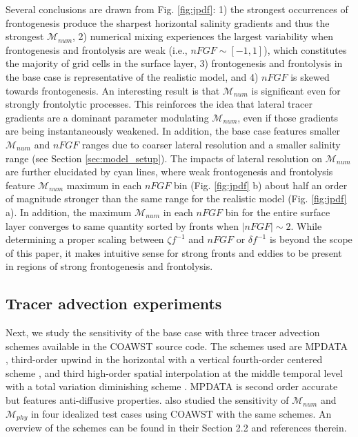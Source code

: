 Several conclusions are drawn from Fig. \ref{fig:jpdf}: 1) the strongest occurrences of frontogenesis produce the sharpest horizontal salinity gradients and thus the strongest $\mathcal{M}_{num}$, 2) numerical mixing experiences the largest variability when frontogenesis and frontolysis are weak (i.e., $nFGF \sim [-1,1]$), which constitutes the majority of grid cells in the surface layer, 3) frontogenesis and frontolysis in the base case is representative of the realistic model, and 4) $nFGF$ is skewed towards frontogenesis. An interesting result is that $\mathcal{M}_{num}$ is significant even for strongly frontolytic processes. This reinforces the idea that lateral tracer gradients are a dominant parameter modulating $\mathcal{M}_{num}$, even if those gradients are being instantaneously weakened. In addition, the base case features smaller $\mathcal{M}_{num}$ and $nFGF$ ranges due to coarser lateral resolution and a smaller salinity range (see Section \ref{sec:model_setup}). The impacts of lateral resolution on $\mathcal{M}_{num}$ are further elucidated by cyan lines, where weak frontogenesis and frontolysis feature $\mathcal{M}_{num}$ maximum in each $nFGF$ bin (Fig. \ref{fig:jpdf} b) about half an order of magnitude stronger than the same range for the realistic model (Fig. \ref{fig:jpdf} a). In addition, the maximum $\mathcal{M}_{num}$ in each $nFGF$ bin for the entire surface layer converges to same quantity sorted by fronts when $|nFGF| \sim 2$. While determining a proper scaling between $\zeta f^{-1}$ and $nFGF$ or $\delta f^{-1}$ is beyond the scope of this paper, it makes intuitive sense for strong fronts and eddies to be present in regions of strong frontogenesis and frontolysis. 

\subsection{Tracer advection experiments} \label{sec:tadv_exp}
Next, we study the sensitivity of the base case with three tracer advection schemes available in the COAWST source code. The schemes used are MPDATA \citep{smolarkiewicz1984fully, Smolarkiewicz_1998}, third-order upwind in the horizontal with a vertical fourth-order centered scheme \citep[U3HC4,][]{shchepetkin1998quasi}, and third high-order spatial interpolation at the middle temporal level with a total variation diminishing scheme \cite[HSIMT,][]{wu2010advection, wu2023evaluation}. MPDATA is second order accurate but features anti-diffusive properties. \citep{Kalra_2019} also studied the sensitivity of $\mathcal{M}_{num}$ and $\mathcal{M}_{phy}$ in four idealized test cases using COAWST with the same schemes. An overview of the schemes can be found in their Section 2.2 and references therein.

